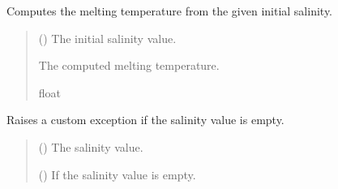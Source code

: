 \documentclass[a4paper,11pt,english,openany]{sphinxmanual}
\begin{document}
\begin{fulllineitems}
\label{\detokenize{api/spyice.preprocess.initial_boundary_conditions:src.spyice.preprocess.initial_boundary_conditions.compute_melting_temperature_from_salinity}}
\pysigstartsignatures
\pysiglinewithargsret
{}
{}
{}
\pysigstopsignatures
\sphinxAtStartPar
Computes the melting temperature from the given initial salinity.
\begin{quote}\begin{description}
\sphinxAtStartPar
{} () \textendash{} The initial salinity value.

\sphinxAtStartPar
The computed melting temperature.

\sphinxAtStartPar
float

\end{description}\end{quote}

\end{fulllineitems}


\begin{fulllineitems}
\label{\detokenize{api/spyice.preprocess.initial_boundary_conditions:src.spyice.preprocess.initial_boundary_conditions.raise_salinity_exception}}
\pysigstartsignatures
\pysiglinewithargsret
{}
{}
{}
\pysigstopsignatures
\sphinxAtStartPar
Raises a custom exception if the salinity value is empty.
\begin{quote}\begin{description}
\sphinxAtStartPar
{} () \textendash{} The salinity value.

\sphinxAtStartPar
{\hyperref[\detokenize{api/spyice.preprocess.initial_boundary_conditions:src.spyice.preprocess.initial_boundary_conditions.SalinityUnavailableError}]{}} () \textendash{} If the salinity value is empty.

\end{description}\end{quote}

\end{fulllineitems}
\end{document}
